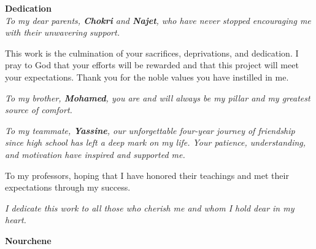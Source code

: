 
\begin{center}
\doublespacing
\centering
\Large\textbf{Dedication} \\
\vspace{1cm}
    \textit{To my dear parents, \textbf{Chokri} and \textbf{Najet}, who have never stopped encouraging me with their unwavering support.}  
    \vspace{0.5cm}
    
    This work is the culmination of your sacrifices, deprivations, and dedication. I pray to God that your efforts will be rewarded and that this project will meet your expectations. Thank you for the noble values you have instilled in me.  
    \vspace{0.5cm}
    
    \textit{To my brother, \textbf{Mohamed}, you are and will always be my pillar and my greatest source of comfort.}  
    \vspace{0.5cm}
    
    \textit{To my teammate, \textbf{Yassine}, our unforgettable four-year journey of friendship since high school has left a deep mark on my life. Your patience, understanding, and motivation have inspired and supported me.}  
    \vspace{0.5cm}
    
    To my professors, hoping that I have honored their teachings and met their expectations through my success.  
    \vspace{0.5cm}
    
    \textit{I dedicate this work to all those who cherish me and whom I hold dear in my heart.}  
    \vspace{1cm}
    
    \textbf{Nourchene}
\end{center}
